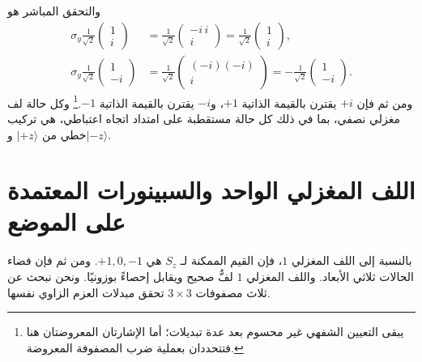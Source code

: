 والتحقق المباشر هو
\begin{align}
\sigma_y\frac{1}{\sqrt2}
\begin{pmatrix}
1\\
i
\end{pmatrix}
&=
\frac{1}{\sqrt2}
\begin{pmatrix}
-i\,i\\
i
\end{pmatrix}
=
\frac{1}{\sqrt2}
\begin{pmatrix}
1\\
i
\end{pmatrix},\\
\sigma_y\frac{1}{\sqrt2}
\begin{pmatrix}
1\\
-i
\end{pmatrix}
&=
\frac{1}{\sqrt2}
\begin{pmatrix}
(-i)(-i)\\
i
\end{pmatrix}
=
-\frac{1}{\sqrt2}
\begin{pmatrix}
1\\
-i
\end{pmatrix}.
\end{align}
ومن ثم فإن \(+i\) يقترن بالقيمة الذاتية \(+1\)، و\(-i\) يقترن بالقيمة الذاتية \(-1\).\footnote{يبقى التعيين الشفهي غير محسوم بعد عدة تبديلات؛ أما الإشارتان المعروضتان هنا فتتحددان بعملية ضرب المصفوفة المعروضة.} وكل حالة لف مغزلي نصفي، بما في ذلك كل حالة مستقطبة على امتداد اتجاه اعتباطي، هي تركيب خطي من \(|+z\rangle\) و\(|-z\rangle\).

\section{اللف المغزلي الواحد والسبينورات المعتمدة على الموضع}

بالنسبة إلى اللف المغزلي \(1\)، فإن القيم الممكنة لـ \(S_z\) هي \(+1,0,-1\). ومن ثم فإن فضاء الحالات ثلاثي الأبعاد. واللف المغزلي \(1\) لفٌّ صحيح ويقابل إحصاءً بوزونيًا. ونحن نبحث عن ثلاث مصفوفات \(3\times3\) تحقق مبدلات العزم الزاوي نفسها.

